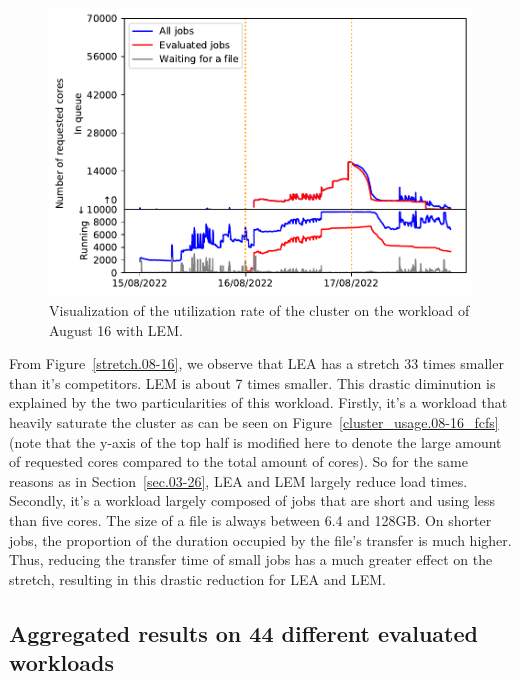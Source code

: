 \documentclass[conference,10pt]{IEEEtran}
\begin{document}
\begin{figure}[H]\centering\includegraphics[scale=0.41]{../MBSS/plot/Cluster_usage/2022-08-16->2022-08-16_V10000_Fcfs_with_a_score_mixed_strategy_x500_x1_x0_x0_Used_nodes_Reduced_450_128_32_256_4_1024_core_by_core.pdf}\caption{Visualization of the utilization rate of the cluster on the workload of August 16 with LEM.}
\label{cluster_usage.08-16_lem}\end{figure}

From Figure~\ref{stretch.08-16}, we observe that LEA has a stretch 33 times smaller than
it's competitors. LEM is about 7 times smaller. This drastic diminution is explained
by the two particularities of this workload.
Firstly, it's a workload that heavily saturate the cluster as can be seen on Figure~\ref{cluster_usage.08-16_fcfs}
(note that the y-axis of the top half is modified here to denote the large amount of requested cores compared to the total amount of cores).
So for the same reasons as in Section~\ref{sec.03-26}, LEA and LEM largely reduce load times.
Secondly, it's a workload largely composed of jobs that are short and using less than five cores.
The size of a file is always between 6.4 and 128GB.
On shorter jobs, the proportion of the duration occupied by the file's transfer is much higher. 
Thus, reducing the transfer time of small jobs has a much greater effect on the stretch, resulting in this 
drastic reduction for LEA and LEM.

\subsection{Aggregated results on 44 different evaluated workloads}
\end{document}
